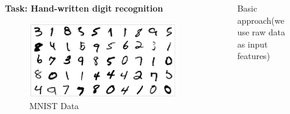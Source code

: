 \begin{frame}  
\begin{columns}

    \begin{overlayarea}{\textwidth}{\textheight}
        \vspace{0.2in}
    \textbf{\large{Task: Hand-written digit recognition}}
        \begin{figure}
            \includegraphics[scale= 0.25]{images/mnist.png}
        \caption{MNIST Data}
    \end{figure}
    \end{overlayarea}

    \begin{overlayarea}{\textwidth}{\textheight}

        \begin{figure}
             
            \caption{Basic approach(we use raw data as input features)}
        \end{figure}

    \end{overlayarea}

  \end{columns}
\end{frame}

